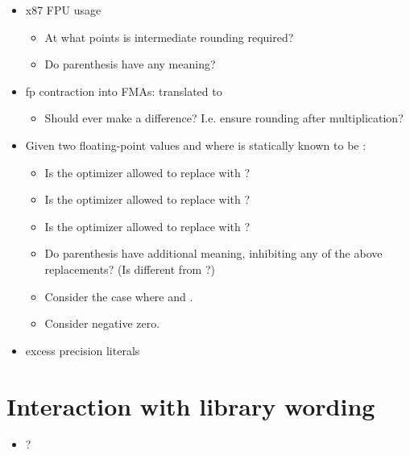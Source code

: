 \begin{itemize}
  \item x87 FPU usage
    \begin{itemize}
      \item At what points is intermediate rounding required?
      \item Do parenthesis have any meaning?
    \end{itemize}

  \item fp contraction into FMAs:  translated to 
    \begin{itemize}
      \item Should  ever make a difference?
        I.e. ensure rounding after multiplication?
    \end{itemize}

  \item Given two floating-point values  and  where  is statically known to be :
    \begin{itemize}
      \item Is the optimizer allowed to replace  with ?
      \item Is the optimizer allowed to replace  with ?
      \item Is the optimizer allowed to replace  with ?
      \item Do parenthesis have additional meaning, inhibiting any of the above replacements?
        (Is  different from ?)
      \item Consider the case where  and .
      \item Consider negative zero.
    \end{itemize}

  \item excess precision literals
\end{itemize}

\section{Interaction with library wording}

\begin{itemize}
  \item {}?
\end{itemize}


